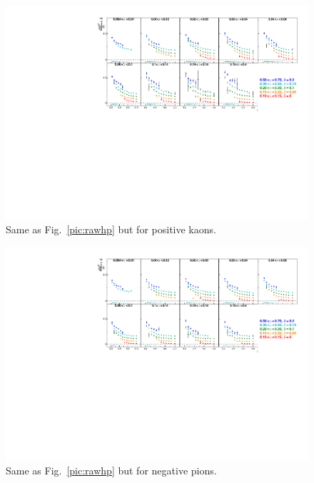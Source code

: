 \begin{figure}[!h]
  \includegraphics[scale=0.85]{./gfx/rawkp.pdf}
  \caption{Same as Fig.~\ref{pic:rawhp} but for positive kaons.}
  \label{pic:rawkp}
\end{figure}

\newpage

\begin{figure}[!h]
  \includegraphics[scale=0.85]{./gfx/rawkm.pdf}
  \caption{Same as Fig.~\ref{pic:rawhp} but for negative pions.}
  \label{pic:rawkm}
\end{figure}

